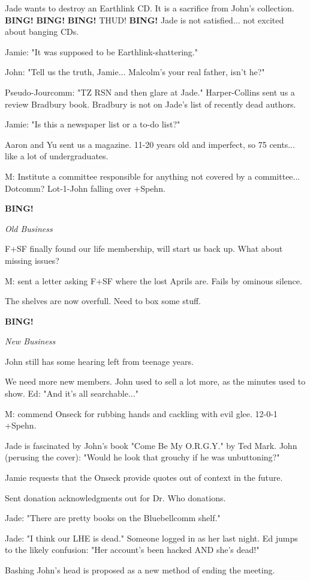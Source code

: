 \documentclass[12pt]{article}
\newcommand{\bing}{{\bf BING!} }
\newcommand{\goto}[1]{\bing \vskip 12pt \centerline{{\em{#1}}}}
\begin{document}
Jade wants to destroy an Earthlink CD. It is a sacrifice from John's collection. \bing \bing \bing THUD! \bing Jade is not satisfied... not excited about banging CDs.

Jamie: "It was supposed to be Earthlink-shattering."

John: "Tell us the truth, Jamie... Malcolm's your real father, isn't he?"

Pseudo-Jourcomm: "TZ RSN and then glare at Jade." Harper-Collins sent us a review Bradbury book. Bradbury is not on Jade's list of recently dead authors.

Jamie: "Is this a newspaper list or a to-do list?"

Aaron and Yu sent us a magazine. 11-20 years old and imperfect, so 75 cents... like a lot of undergraduates.

M: Institute a committee responsible for anything not covered by a committee... Dotcomm? Lot-1-John falling over +Spehn.

\goto{Old Business}

F+SF finally found our life membership, will start us back up. What about missing issues?

M: sent a letter asking F+SF where the lost Aprils are. Fails by ominous silence.

The shelves are now overfull. Need to box some stuff.

\goto{New Business}

John still has some hearing left from teenage years.

We need more new members. John used to sell a lot more, as the minutes used to show. Ed: "And it's all searchable..."

M: commend Onseck for rubbing hands and cackling with evil glee. 12-0-1 +Spehn.

Jade is fascinated by John's book "Come Be My O.R.G.Y." by Ted Mark. John (perusing the cover): "Would he look that grouchy if he was unbuttoning?"

Jamie requests that the Onseck provide quotes out of context in the future.

Sent donation acknowledgments out for Dr. Who donations.

Jade: "There are pretty books on the Bluebellcomm shelf."

Jade: "I think our LHE is dead." Someone logged in as her last night. Ed jumps to the likely confusion: "Her account's been hacked AND she's dead!"

Bashing John's head is proposed as a new method of ending the meeting.
\end{document}
